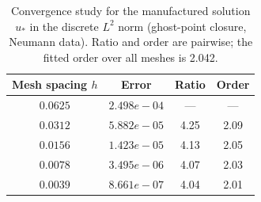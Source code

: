 \begin{table}[H]
\centering
\begin{tabular}{cccc}
\toprule
\textbf{Mesh spacing $h$} & \textbf{Error} & \textbf{Ratio} & \textbf{Order} \\
\midrule
$0.0625$ & $2.498e-04$ & --- & --- \\
$0.0312$ & $5.882e-05$ & 4.25 & 2.09 \\
$0.0156$ & $1.423e-05$ & 4.13 & 2.05 \\
$0.0078$ & $3.495e-06$ & 4.07 & 2.03 \\
$0.0039$ & $8.661e-07$ & 4.04 & 2.01 \\
\bottomrule
\end{tabular}
\caption{Convergence study for the manufactured solution $u_*$ in the discrete $L^2$ norm (ghost-point closure, Neumann data).  Ratio and order are pairwise; the fitted order over all meshes is 2.042.}
\label{tab:mms-simple}
\end{table}